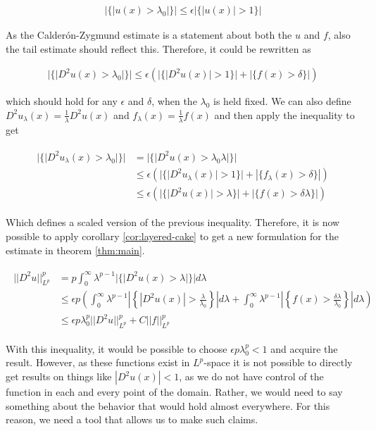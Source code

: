 \documentclass[12pt]{artikel1}
\begin{document}
\begin{gather*}
    |\{|u(x)>\lambda_0|\}|\leq\epsilon|\{|u(x)|>1\}|
\end{gather*}

\noindent As the Calder\'{o}n-Zygmund estimate is a statement about both the $u$ and $f$, also the tail estimate should reflect this. Therefore, it could be rewritten as

\begin{gather}\label{eq:ineq}
    |\{|D^2u(x)>\lambda_0|\}|\leq\epsilon(|\{|D^2u(x)|>1\}|+|\{f(x)>\delta\}|)
\end{gather}

\noindent which should hold for any $\epsilon$ and $\delta$, when the $\lambda_0$ is held fixed. We can also define $D^2u_\lambda(x)=\frac{1}{\lambda}D^2u(x)$ and $f_\lambda(x)=\frac{1}{\lambda}f(x)$ and then apply the inequality to get

\begin{align}\label{eq:scaling}
\begin{split}
    |\{|D^2u_\lambda(x)>\lambda_0|\}|&=|\{|D^2u(x)>\lambda_0\lambda|\}| \\
    &\leq\epsilon(|\{|D^2u_\lambda(x)|>1\}|+|\{f_\lambda(x)>\delta\}|) \\
    &\leq\epsilon(|\{|D^2u(x)|>\lambda\}|+|\{f(x)>\delta\lambda\}|)
\end{split}
\end{align}

\noindent Which defines a scaled version of the previous inequality. Therefore, it is now possible to apply corollary \ref{cor:layered-cake} to get a new formulation for the estimate in theorem \ref{thm:main}.

\begin{align}%
\begin{split}
    ||D^2u||_{L^p}^p&=p\int_0^\infty\lambda^{p-1}|\{|D^2u(x)>\lambda|\}|d\lambda \\
    &\leq\epsilon p\left(\int_0^\infty\lambda^{p-1}\left|\left\{|D^2u(x)|>\frac{\lambda}{\lambda_0}\right\}\right|d\lambda+\int_0^\infty\lambda^{p-1}\left|\left\{f(x)>\frac{\delta\lambda}{\lambda_0}\right\}\right|d\lambda\right) \\
    &\leq\epsilon p\lambda_0^p||D^2u||_{L^p}^p+C||f||_{L^p}^p
\end{split}
\end{align}

With this inequality, it would be possible to choose $\epsilon p\lambda_0^p<1$ and acquire the result. However, as these functions exist in $L^p$-space it is not possible to directly get results on things like $|D^2u(x)|<1$, as we do not have control of the function in each and every point of the domain. Rather, we would need to say something about the behavior that would hold almost everywhere. For this reason, we need a tool that allows us to make such claims.
\end{document}
